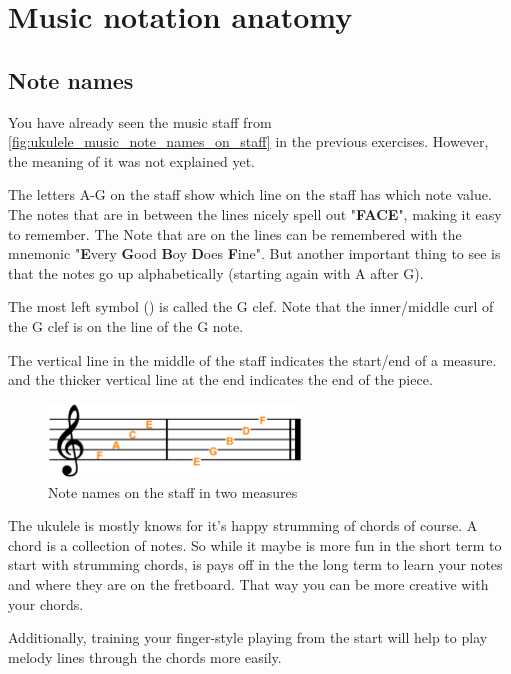 \section{Music notation anatomy}

\subsection{Note names}

You have already seen the music staff from \autoref{fig:ukulele_music_note_names_on_staff} in the previous exercises. However, the meaning of it was not explained yet.

The letters A-G on the staff show which line on the staff has which note value. The notes that are in between the lines nicely spell out "\textbf{FACE}", making it easy to remember. The Note that are on the lines can be remembered with the mnemonic "\textbf{E}very \textbf{G}ood \textbf{B}oy \textbf{D}oes \textbf{F}ine". But another important thing to see is that the notes go up alphabetically (starting again with A after G). 

The most left symbol (\clefG) is called the G clef. Note that the inner/middle curl of the G clef is on the line of the G note. 

The vertical line in the middle of the staff indicates the start/end of a measure. and the thicker vertical line at the end indicates the end of the piece.

\begin{figure}[h]
	\centering
	\includegraphics[width=0.6\textwidth]{../../Images/MusicNotation_MeasureNoteNames.png}
	\caption{Note names on the staff in two measures}
	\label{fig:ukulele_music_note_names_on_staff}
\end{figure}

The ukulele is mostly knows for it's happy strumming of chords of course. A chord is a collection of notes. So while it maybe is more fun in the short term to start with strumming chords, is pays off in the the long term to learn your notes and where they are on the fretboard. That way you can be more creative with your chords.

Additionally, training your finger-style playing from the start will help to play melody lines through the chords more easily.

